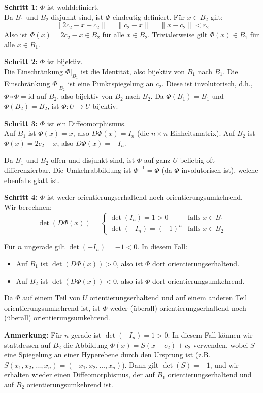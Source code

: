 \documentclass{article}
\begin{document}
\textbf{Schritt 1:} $\Phi$ ist wohldefiniert.\\
Da $B_1$ und $B_2$ disjunkt sind, ist $\Phi$ eindeutig definiert. Für $x \in B_2$ gilt:
$$\|2c_2 - x - c_2\| = \|c_2 - x\| = \|x - c_2\| < r_2$$
Also ist $\Phi(x) = 2c_2 - x \in B_2$ für alle $x \in B_2$. Trivialerweise gilt $\Phi(x) \in B_1$ für alle $x \in B_1$.

\textbf{Schritt 2:} $\Phi$ ist bijektiv.\\
Die Einschränkung $\Phi|_{B_1}$ ist die Identität, also bijektiv von $B_1$ nach $B_1$.
Die Einschränkung $\Phi|_{B_2}$ ist eine Punktspiegelung an $c_2$. Diese ist involutorisch, d.h., $\Phi \circ \Phi = \text{id}$ auf $B_2$, also bijektiv von $B_2$ nach $B_2$.
Da $\Phi(B_1) = B_1$ und $\Phi(B_2) = B_2$, ist $\Phi: U \to U$ bijektiv.

\textbf{Schritt 3:} $\Phi$ ist ein Diffeomorphismus.\\
Auf $B_1$ ist $\Phi(x) = x$, also $D\Phi(x) = I_n$ (die $n \times n$ Einheitsmatrix).
Auf $B_2$ ist $\Phi(x) = 2c_2 - x$, also $D\Phi(x) = -I_n$.

Da $B_1$ und $B_2$ offen und disjunkt sind, ist $\Phi$ auf ganz $U$ beliebig oft differenzierbar. Die Umkehrabbildung ist $\Phi^{-1} = \Phi$ (da $\Phi$ involutorisch ist), welche ebenfalls glatt ist.

\textbf{Schritt 4:} $\Phi$ ist weder orientierungserhaltend noch orientierungsumkehrend.\\
Wir berechnen:
$$\det(D\Phi(x)) = \begin{cases}
\det(I_n) = 1 > 0 & \text{falls } x \in B_1\\
\det(-I_n) = (-1)^n & \text{falls } x \in B_2
\end{cases}$$

Für $n$ ungerade gilt $\det(-I_n) = -1 < 0$. In diesem Fall:
\begin{itemize}
    \item Auf $B_1$ ist $\det(D\Phi(x)) > 0$, also ist $\Phi$ dort orientierungserhaltend.
    \item Auf $B_2$ ist $\det(D\Phi(x)) < 0$, also ist $\Phi$ dort orientierungsumkehrend.
\end{itemize}

Da $\Phi$ auf einem Teil von $U$ orientierungserhaltend und auf einem anderen Teil orientierungsumkehrend ist, ist $\Phi$ weder (überall) orientierungserhaltend noch (überall) orientierungsumkehrend.

\textbf{Anmerkung:} Für $n$ gerade ist $\det(-I_n) = 1 > 0$. In diesem Fall können wir stattdessen auf $B_2$ die Abbildung $\Phi(x) = S(x - c_2) + c_2$ verwenden, wobei $S$ eine Spiegelung an einer Hyperebene durch den Ursprung ist (z.B. $S(x_1, x_2, \ldots, x_n) = (-x_1, x_2, \ldots, x_n)$). Dann gilt $\det(S) = -1$, und wir erhalten wieder einen Diffeomorphismus, der auf $B_1$ orientierungserhaltend und auf $B_2$ orientierungsumkehrend ist.
\end{document}
